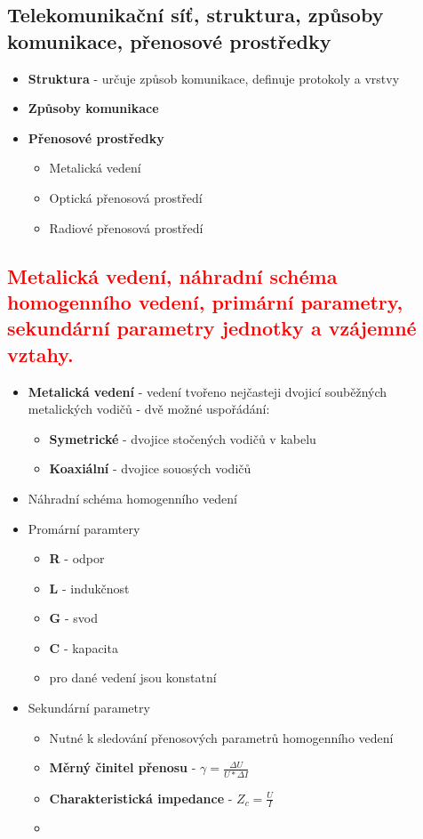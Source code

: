 \subsection{Telekomunikační síť, struktura, způsoby komunikace, přenosové prostředky}
\begin{itemize}
    \item \textbf{Struktura} - určuje způsob komunikace, definuje protokoly a vrstvy
    \item \textbf{Způsoby komunikace}
    \item \textbf{Přenosové prostředky} \begin{itemize}
        \item Metalická vedení
        \item  Optická přenosová prostředí
        \item Radiové přenosová prostředí
    \end{itemize}
\end{itemize}


\subsection{\textcolor{red}{Metalická vedení, náhradní schéma homogenního vedení, primární parametry, sekundární parametry jednotky a vzájemné vztahy.}}
\begin{itemize}
    \item \textbf{Metalická vedení} - vedení tvořeno nejčasteji dvojicí souběžných metalických vodičů - dvě možné uspořádání:\begin{itemize}
        \item \textbf{Symetrické} - dvojice stočených vodičů v kabelu
        \item  \textbf{Koaxiální} - dvojice souosých vodičů
    \end{itemize} 
    \item Náhradní schéma homogenního vedení
    \item Promární paramtery
    \begin{itemize}
        \item \textbf{R} - odpor
        \item \textbf{L} - indukčnost
        \item  \textbf{G} - svod
        \item \textbf{C} - kapacita
        \item  pro dané vedení jsou konstatní
    \end{itemize}
    \item Sekundární parametry
    \begin{itemize}
        \item Nutné k sledování přenosových parametrů homogenního vedení
        \item \textbf{Měrný činitel přenosu} - $\gamma=\frac{\Delta U}{U*\Delta I}$
        \item \textbf{Charakteristická impedance} - $Z_c=\frac{U}{I}$
        \item  {}
    \end{itemize}
\end{itemize}


